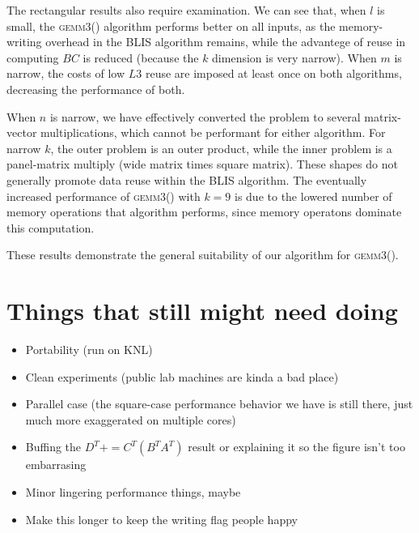 \documentclass[12pt]{article}
\newcommand*{\pluseq}{\mathrel{{+}{=}}}
\newcommand*{\gemmt}{{\textsc{gemm3()}}}
\begin{document}
The rectangular results also require examination.
We can see that, when $l$ is small, the \gemmt{} algorithm performs better on all inputs, as the memory-writing overhead in the BLIS algorithm remains, while the advantege of reuse in computing $BC$ is reduced (because the $k$ dimension is very narrow).
When $m$ is narrow, the costs of low $L3$ reuse are imposed at least once on both algorithms, decreasing the performance of both.

When $n$ is narrow, we have effectively converted the problem to several matrix-vector multiplications, which cannot be performant for either algorithm.
For narrow $k$, the outer problem is an outer product, while the inner problem is a panel-matrix multiply (wide matrix times square matrix).
These shapes do not generally promote data reuse within the BLIS algorithm.
The eventually increased performance of \gemmt{} with $k = 9$ is due to the lowered number of memory operations that algorithm performs, since memory operatons dominate this computation.

These results demonstrate the general suitability of our algorithm for \gemmt{}.

\section{Things that still might need doing}
\begin{itemize}
\item Portability (run on KNL)
\item Clean experiments (public lab machines are kinda a bad place)
\item Parallel case (the square-case performance behavior we have is still there, just much more exaggerated on multiple cores)
\item Buffing the $D^T \pluseq C^T(B^TA^T)$ result or explaining it so the figure isn't too embarrasing
\item Minor lingering performance things, maybe
\item Make this longer to keep the writing flag people happy
\end{itemize}
\printbibliography{}
\end{document}
